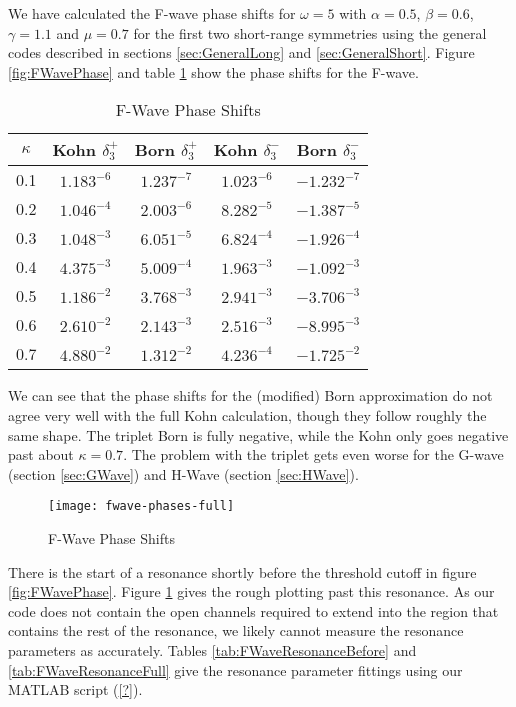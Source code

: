 \documentclass[Dissertation.tex]{subfiles}
\begin{document}
We have calculated the F-wave phase shifts for $\omega = 5$ with $\alpha = 0.5$, $\beta = 0.6$, $\gamma = 1.1$ and $\mu = 0.7$ for the first two short-range symmetries using the general codes described in sections \ref{sec:GeneralLong} and \ref{sec:GeneralShort}. Figure \ref{fig:FWavePhase} and table \ref{tab:FWavePhase} show the phase shifts for the F-wave.

\setlength{\abovecaptionskip}{6pt}
\setlength{\belowcaptionskip}{6pt}
\begin{table}[H]
\centering
\begin{tabular}{c | c c | c c}
\toprule
$\kappa$ & Kohn $\delta_3^+$ & Born $\delta_3^+$ & Kohn $\delta_3^-$ & Born $\delta_3^-$ \\
\midrule
0.1 &	$1.183^{-6}$ & $1.237^{-7}$ & $1.023^{-6}$ & $-1.232^{-7}$ \\
0.2 &	$1.046^{-4}$ & $2.003^{-6}$ & $8.282^{-5}$ & $-1.387^{-5}$ \\
0.3 &	$1.048^{-3}$ & $6.051^{-5}$ & $6.824^{-4}$ & $-1.926^{-4}$ \\
0.4 &	$4.375^{-3}$ & $5.009^{-4}$ & $1.963^{-3}$ & $-1.092^{-3}$ \\
0.5 & $1.186^{-2}$ & $3.768^{-3}$ & $2.941^{-3}$ & $-3.706^{-3}$ \\
0.6 &	$2.610^{-2}$ & $2.143^{-3}$ & $2.516^{-3}$ & $-8.995^{-3}$ \\
0.7 &	$4.880^{-2}$ & $1.312^{-2}$ & $4.236^{-4}$ & $-1.725^{-2}$ \\
\bottomrule
\end{tabular}
\caption{F-Wave Phase Shifts}
\label{tab:FWavePhase}
\end{table}

We can see that the phase shifts for the (modified) Born approximation do not agree very well with the full Kohn calculation, though they follow roughly the same shape. The triplet Born is fully negative, while the Kohn only goes negative past about $\kappa = 0.7$. The problem with the triplet gets even worse for the G-wave (section \ref{sec:GWave}) and H-Wave (section \ref{sec:HWave}).

\begin{figure}[H]
	\centering
	\texttt{[image: fwave-phases-full]}
	\caption{F-Wave Phase Shifts}
	\label{fig:FWavePhaseFull}
\end{figure}

There is the start of a resonance shortly before the threshold cutoff in figure \ref{fig:FWavePhase}. Figure \ref{fig:FWavePhaseFull} gives the rough plotting past this resonance. As our code does not contain the open channels required to extend into the region that contains the rest of the resonance, we likely cannot measure the resonance parameters as accurately. Tables \ref{tab:FWaveResonanceBefore} and \ref{tab:FWaveResonanceFull} give the resonance parameter fittings using our MATLAB script (\ref{?}).
\end{document}
